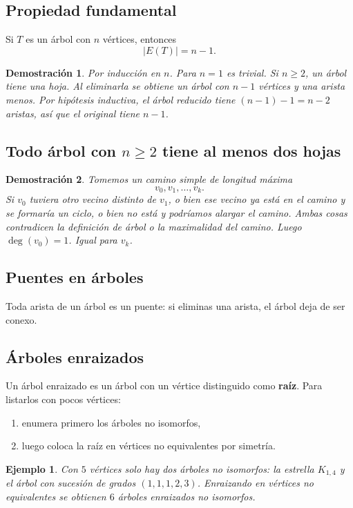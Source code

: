 \documentclass[11pt,a4paper]{article}
\newtheorem*{ej}{Ejemplo}
\newtheorem*{dem}{Demostración}
\begin{document}
\subsection{Propiedad fundamental}
Si $T$ es un árbol con $n$ vértices, entonces
\[
|E(T)|=n-1.
\]

\begin{dem}
Por inducción en $n$. Para $n=1$ es trivial. Si $n\ge 2$, un árbol tiene una hoja. Al eliminarla se obtiene un árbol con $n-1$ vértices y una arista menos. Por hipótesis inductiva, el árbol reducido tiene $(n-1)-1=n-2$ aristas, así que el original tiene $n-1$.
\end{dem}

\subsection{Todo árbol con $n\ge 2$ tiene al menos dos hojas}

\begin{dem}
Tomemos un camino simple de longitud máxima
\[
v_0,v_1,\dots,v_k.
\]
Si $v_0$ tuviera otro vecino distinto de $v_1$, o bien ese vecino ya está en el camino y se formaría un ciclo, o bien no está y podríamos alargar el camino. Ambas cosas contradicen la definición de árbol o la maximalidad del camino. Luego $\deg(v_0)=1$. Igual para $v_k$.
\end{dem}

\subsection{Puentes en árboles}
Toda arista de un árbol es un puente: si eliminas una arista, el árbol deja de ser conexo.

\subsection{Árboles enraizados}
Un árbol enraizado es un árbol con un vértice distinguido como \textbf{raíz}. Para listarlos con pocos vértices:
\begin{enumerate}
    \item enumera primero los árboles no isomorfos,
    \item luego coloca la raíz en vértices no equivalentes por simetría.
\end{enumerate}

\begin{ej}
Con $5$ vértices solo hay dos árboles no isomorfos: la estrella $K_{1,4}$ y el árbol con sucesión de grados $(1,1,1,2,3)$. Enraizando en vértices no equivalentes se obtienen $6$ árboles enraizados no isomorfos.
\end{ej}
\end{document}
